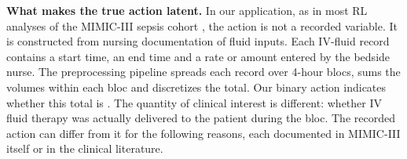 \documentclass[12pt]{article}
\newcommand{\res}[1]{{\color{red}{#1}}}
\newcommand{\0}{\boldsymbol{0}}
\theoremstyle{definition}
\begin{document}
\textbf{What makes the true action latent.} In our application, as in most RL analyses of the MIMIC-III sepsis cohort \citep{komorowski2018artificial,gottesman2019guidelines}, the action is not a recorded variable. It is constructed from nursing documentation of fluid inputs. Each IV-fluid record contains a start time, an end time and a rate or amount entered by the bedside nurse. The preprocessing pipeline spreads each record over 4-hour blocs, sums the volumes within each bloc and discretizes the total. Our binary action indicates whether this total is \res{positive / above the chosen threshold}. The quantity of clinical interest is different: whether IV fluid therapy was actually delivered to the patient during the bloc. The recorded action can differ from it for the following reasons, each documented in MIMIC-III itself or in the clinical literature.
\end{document}
